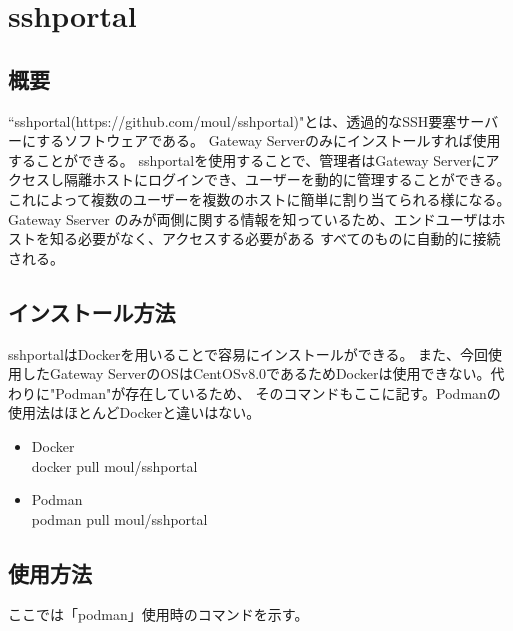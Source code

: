 \documentclass[11pt,a4j,titlepage]{jreport}
\begin{document}

\section{sshportal}\label{sshportal}

\subsection*{概要}
``sshportal(https://github.com/moul/sshportal)"とは、透過的なSSH要塞サーバーにするソフトウェアである。
Gateway Serverのみにインストールすれば使用することができる。
sshportalを使用することで、管理者はGateway Serverにアクセスし隔離ホストにログインでき、ユーザーを動的に管理することができる。
これによって複数のユーザーを複数のホストに簡単に割り当てられる様になる。
Gateway Sserver のみが両側に関する情報を知っているため、エンドユーザはホストを知る必要がなく、アクセスする必要がある
すべてのものに自動的に接続される。




\subsection*{インストール方法}
sshportalはDockerを用いることで容易にインストールができる。
また、今回使用したGateway ServerのOSはCentOSv8.0であるためDockerは使用できない。代わりに"Podman"が存在しているため、
そのコマンドもここに記す。Podmanの使用法はほとんどDockerと違いはない。

\begin{itemize}
    \item Docker\mbox{}\\docker pull moul/sshportal
    \item Podman\mbox{}\\podman pull moul/sshportal
\end{itemize}

\subsection*{使用方法}
ここでは「podman」使用時のコマンドを示す。
\end{document}
